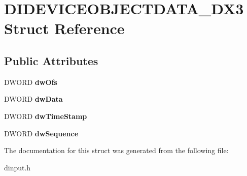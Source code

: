 \hypertarget{struct_d_i_d_e_v_i_c_e_o_b_j_e_c_t_d_a_t_a___d_x3}{\section{D\-I\-D\-E\-V\-I\-C\-E\-O\-B\-J\-E\-C\-T\-D\-A\-T\-A\-\_\-\-D\-X3 Struct Reference}
\label{struct_d_i_d_e_v_i_c_e_o_b_j_e_c_t_d_a_t_a___d_x3}
}
\subsection*{Public Attributes}
\begin{DoxyCompactItemize}
\item 
\hypertarget{struct_d_i_d_e_v_i_c_e_o_b_j_e_c_t_d_a_t_a___d_x3_a1b69f544cd602fd928f8b239daae046d}{D\-W\-O\-R\-D {\bfseries dw\-Ofs}}\label{struct_d_i_d_e_v_i_c_e_o_b_j_e_c_t_d_a_t_a___d_x3_a1b69f544cd602fd928f8b239daae046d}

\item 
\hypertarget{struct_d_i_d_e_v_i_c_e_o_b_j_e_c_t_d_a_t_a___d_x3_a5388cbb0d818fe75f296c23b7a137a3d}{D\-W\-O\-R\-D {\bfseries dw\-Data}}\label{struct_d_i_d_e_v_i_c_e_o_b_j_e_c_t_d_a_t_a___d_x3_a5388cbb0d818fe75f296c23b7a137a3d}

\item 
\hypertarget{struct_d_i_d_e_v_i_c_e_o_b_j_e_c_t_d_a_t_a___d_x3_a502e24c37c33eb55e9b379695c3c5dc8}{D\-W\-O\-R\-D {\bfseries dw\-Time\-Stamp}}\label{struct_d_i_d_e_v_i_c_e_o_b_j_e_c_t_d_a_t_a___d_x3_a502e24c37c33eb55e9b379695c3c5dc8}

\item 
\hypertarget{struct_d_i_d_e_v_i_c_e_o_b_j_e_c_t_d_a_t_a___d_x3_a503f905cf191281a63d19b6bcbf8764d}{D\-W\-O\-R\-D {\bfseries dw\-Sequence}}\label{struct_d_i_d_e_v_i_c_e_o_b_j_e_c_t_d_a_t_a___d_x3_a503f905cf191281a63d19b6bcbf8764d}

\end{DoxyCompactItemize}


The documentation for this struct was generated from the following file\-:\begin{DoxyCompactItemize}
\item 
dinput.\-h\end{DoxyCompactItemize}
